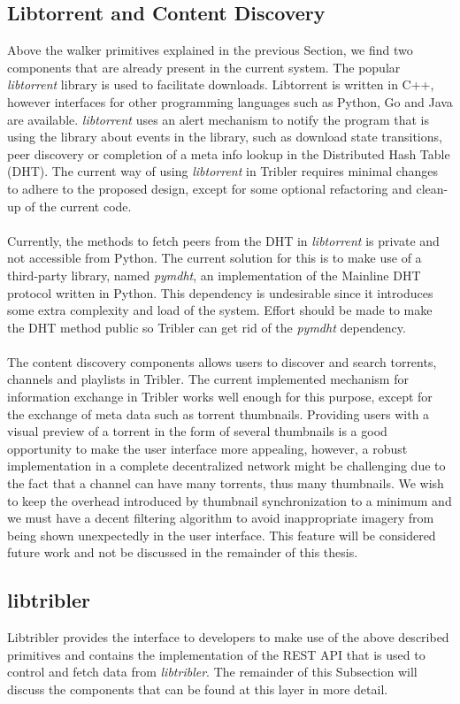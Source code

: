 \subsection{Libtorrent and Content Discovery}
Above the walker primitives explained in the previous Section, we find two components that are already present in the current system. The popular \emph{libtorrent} library is used to facilitate downloads. Libtorrent is written in C++, however interfaces for other programming languages such as Python, Go and Java are available. \emph{libtorrent} uses an alert mechanism to notify the program that is using the library about events in the library, such as download state transitions, peer discovery or completion of a meta info lookup in the Distributed Hash Table (DHT). The current way of using \emph{libtorrent} in Tribler requires minimal changes to adhere to the proposed design, except for some optional refactoring and clean-up of the current code.\\\\
Currently, the methods to fetch peers from the DHT in \emph{libtorrent} is private and not accessible from Python. The current solution for this is to make use of a third-party library, named \emph{pymdht}, an implementation of the Mainline DHT protocol written in Python. This dependency is undesirable since it introduces some extra complexity and load of the system. Effort should be made to make the DHT method public so Tribler can get rid of the \emph{pymdht} dependency.\\\\
The content discovery components allows users to discover and search torrents, channels and playlists in Tribler. The current implemented mechanism for information exchange in Tribler works well enough for this purpose, except for the exchange of meta data such as torrent thumbnails. Providing users with a visual preview of a torrent in the form of several thumbnails is a good opportunity to make the user interface more appealing, however, a robust implementation in a complete decentralized network might be challenging due to the fact that a channel can have many torrents, thus many thumbnails. We wish to keep the overhead introduced by thumbnail synchronization to a minimum and we must have a decent filtering algorithm to avoid inappropriate imagery from being shown unexpectedly in the user interface. This feature will be considered future work and not be discussed in the remainder of this thesis.

\subsection{libtribler}
Libtribler provides the interface to developers to make use of the above described primitives and contains the implementation of the REST API that is used to control and fetch data from \emph{libtribler}. The remainder of this Subsection will discuss the components that can be found at this layer in more detail.

